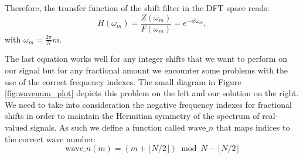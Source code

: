 \documentclass[]{usiinfbachelorproject}
\begin{document}
	Therefore, the transfer function of the shift filter in the DFT space reads:
	\begin{equation}
		H(\omega_m) = \frac{Z(\omega_m)}{F(\omega_m)} = e^{-i  \delta \omega_m  }, 
	\end{equation}with $\omega_m = \frac{2 \pi}{N}m$.
	
	The last equation works well for any integer shifts that we want to perform on our signal but for any fractional amount we encounter some problems with the use of the correct frequency indexes. The small diagram in Figure \ref{fig:wavenum_plot} depicts this problem on the left and our solution on the right. 
		We need to take into consideration the negative frequency indexes for fractional shifts in order to maintain the Hermitian symmetry of the spectrum of real-valued signals. As such we define a function called $\mathrm{wave\_}n$ that maps indices to the correct wave number:
		\begin{equation}
			\mathrm{wave\_}n(m) = (m + \lfloor N/2 \rfloor ) \bmod N - \lfloor N/2 \rfloor
		\end{equation}
\end{document}
